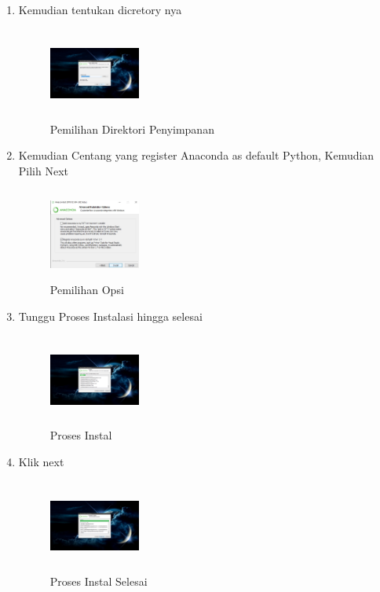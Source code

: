 \begin{enumerate}
    \item Kemudian tentukan dicretory nya
    \begin{figure}[!Htbp]
        \centering
        \includegraphics[width=3cm,height=3cm]{figures/Screenshot(83).png}
        \caption{Pemilihan Direktori Penyimpanan}
        \label{Directory}
        \end{figure}

    \item Kemudian Centang yang register Anaconda as default Python, Kemudian Pilih Next
    \begin{figure}[!Htbp]
        \centering
        \includegraphics[width=3cm,height=3cm]{figures/Screenshot(84).jpeg}
        \caption{Pemilihan Opsi}
        \label{opsi}
        \end{figure}

    \item Tunggu Proses Instalasi hingga selesai
    \begin{figure}[!Htbp]
        \centering
        \includegraphics[width=3cm,height=3cm]{figures/Screenshot(85).png}
        \caption{Proses Instal}
        \label{Proses}
        \end{figure}

    \item Klik next
    \begin{figure}[!Htbp]
        \centering
        \includegraphics[width=3cm,height=3cm]{figures/Screenshot(86).png}
        \caption{Proses Instal Selesai}
        \label{Proses}
        \end{figure}


\end{enumerate}

